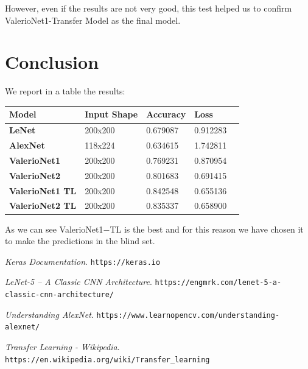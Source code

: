 \documentclass[12pt]{article}
\begin{document}
However, even if the results are not very good, this test helped us to confirm ValerioNet1-Transfer Model as the final model.

\newpage
\section{Conclusion}

We report in a table the results:

\bigskip
\begin{tabular}{ | l | l | l | l | l | }
    \hline
    \textbf{Model} & \textbf{Input Shape} & \textbf{Accuracy} & \textbf{Loss} \\ \hline
    \textbf{LeNet}          & 200x200 & 0.679087 & 0.912283  \\ \hline
    \textbf{AlexNet}        & 118x224 & 0.634615 & 1.742811  \\ \hline
    \textbf{ValerioNet1}    & 200x200 & 0.769231 & 0.870954  \\ \hline
    \textbf{ValerioNet2}    & 200x200 & 0.801683 & 0.691415  \\ \hline
    \textbf{ValerioNet1 TL} & 200x200 & 0.842548 & 0.655136  \\ \hline
    \textbf{ValerioNet2 TL} & 200x200 & 0.835337 & 0.658900  \\ \hline
\end{tabular}
\bigskip

As we can see ValerioNet1$-$TL is the best and for this reason we have chosen it to make the predictions in the blind set.
\vfill

\begin{thebibliography}{99}

{\em Keras Documentation}.\newline
  \verb|https://keras.io|

{\em LeNet-5 – A Classic CNN Architecture}.\newline
  \verb|https://engmrk.com/lenet-5-a-classic-cnn-architecture/|

{\em Understanding AlexNet}.\newline
  \verb|https://www.learnopencv.com/understanding-alexnet/|

{\em Transfer Learning - Wikipedia}.\newline
  \verb|https://en.wikipedia.org/wiki/Transfer_learning|

\end{thebibliography}
\end{document}
